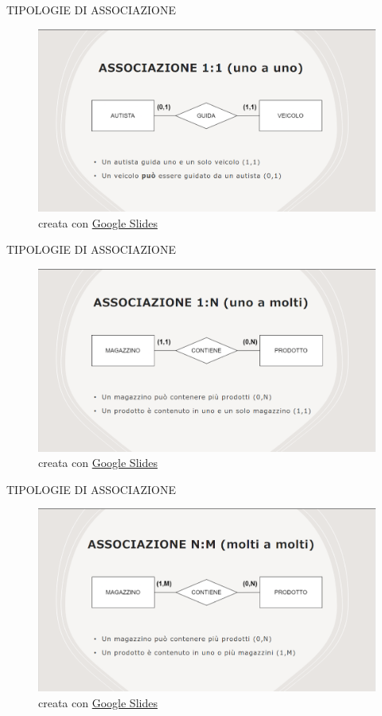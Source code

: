 \documentclass[aspectratio=1610]{beamer}
\begin{document}
\begin{frame}{TIPOLOGIE DI ASSOCIAZIONE}
    \begin{figure}
        \includegraphics[width=\linewidth]{img/1a1_2.png}
        \caption{{creata con \href{https://docs.google.com/presentation/}{Google Slides}}}
    \end{figure}
\end{frame}

\begin{frame}{TIPOLOGIE DI ASSOCIAZIONE}
    \begin{figure}
        \includegraphics[width=\linewidth]{img/1an.png}
        \caption{{creata con \href{https://docs.google.com/presentation/}{Google Slides}}}
    \end{figure}
\end{frame}

\begin{frame}{TIPOLOGIE DI ASSOCIAZIONE}
    \begin{figure}
        \includegraphics[width=\linewidth]{img/nam.png}
        \caption{{creata con \href{https://docs.google.com/presentation/}{Google Slides}}}
    \end{figure}
\end{frame}
\end{document}
